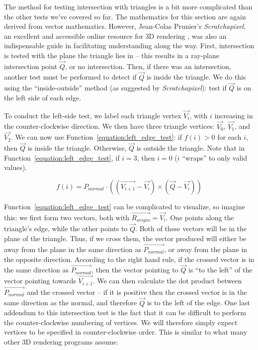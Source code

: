 \documentclass[11pt]{article}
\newcommand{\rayorg}{\vec{R_{origin}}}
\begin{document}
The method for testing intersection with triangles is a bit more complicated than the other tests we've covered so far.
The mathematics for this section are again derived from vector mathematics.
However, Jean-Colas Prunier's {\it Scratchapixel}, an excellent and accessible online resource for 3D rendering \cite{prunier2017triangle}, was also an indispensable guide in facilitating understanding along the way.
First, intersection is tested with the plane the triangle lies in -- this results in a ray-plane intersection point $\vec{Q}$, or no intersection.
Then, if there was an intersection, another test must be performed to detect if $\vec{Q}$ is inside the triangle.
We do this using the ``inside-outside'' method (as suggested by {\it Scratchapixel}): test if $\vec{Q}$ is on the left side of each edge.

To conduct the left-side test, we label each triangle vertex $\vec{V_i}$, with $i$ increasing in the counter-clockwise direction.
We then have three triangle vertices: $\vec{V_0}$, $\vec{V_1}$, and $\vec{V_2}$.
We can now use Function~\ref{equation:left_edge_test}: if $f(i) > 0$ for each $i$, then $\vec{Q}$ is inside the triangle.
Otherwise, $\vec{Q}$ is outside the triangle.
Note that in Function~\ref{equation:left_edge_test}, if $i = 3$, then $i = 0$ ($i$ ``wraps'' to only valid values).

\begin{equation}
  \label{equation:left_edge_test}
  f(i) = P_{normal} \cdot ((\vec{V_{i+1}} - \vec{V_i}) \times (\vec{Q} - \vec{V_i}))
\end{equation}

Function~\ref{equation:left_edge_test} can be complicated to visualize, so imagine this: we first form two vectors, both with $\rayorg = \vec{V_i}$.
One points along the triangle's edge, while the other points to $\vec{Q}$.
Both of these vectors will be in the plane of the triangle.
Thus, if we cross them, the vector produced will either be away from the plane in the same direction as $\vec{P_{normal}}$, or away from the plane in the opposite direction.
According to the right hand rule, if the crossed vector is in the same direction as $\vec{P_{normal}}$, then the vector pointing to $\vec{Q}$ is ``to the left'' of the vector pointing towards $\vec{V_{i+1}}$.
We can then calculate the dot product between $\vec{P_{normal}}$ and the crossed vector -- if it is positive then the crossed vector is in the same direction as the normal, and therefore $\vec{Q}$ is to the left of the edge.
One last addendum to this intersection test is the fact that it can be difficult to perform the counter-clockwise numbering of vertices.
We will therefore simply expect vertices to be specified in counter-clockwise order.
This is similar to what many other 3D rendering programs assume.
\end{document}
